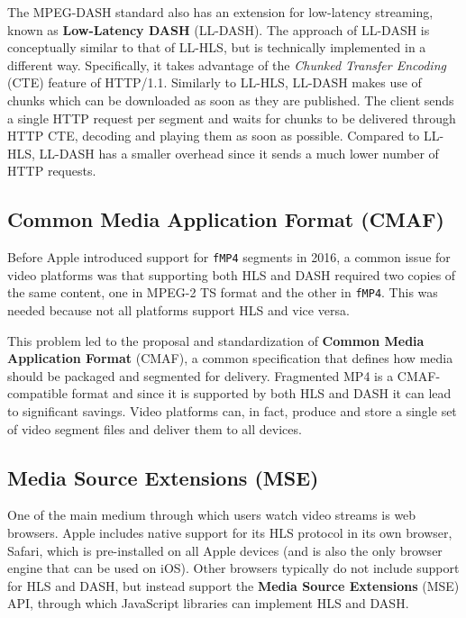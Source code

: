 The MPEG-DASH standard also has an extension for low-latency streaming, known as \textbf{Low-Latency DASH} (LL-DASH). The approach of LL-DASH is conceptually similar to that of LL-HLS, but is technically implemented in a different way. Specifically, it takes advantage of the \textit{Chunked Transfer Encoding} (CTE) feature of HTTP/1.1. Similarly to LL-HLS, LL-DASH makes use of chunks which can be downloaded as soon as they are published. The client sends a single HTTP request per segment and waits for chunks to be delivered through HTTP CTE, decoding and playing them as soon as possible. Compared to LL-HLS, LL-DASH has a smaller overhead since it sends a much lower number of HTTP requests.\cite{llhls_vs_lldash}

\subsection{Common Media Application Format (CMAF)}
\label{sec:bg/technologies/cmaf}

Before Apple introduced support for \texttt{fMP4} segments in 2016, a common issue for video platforms was that supporting both HLS and DASH required two copies of the same content, one in MPEG-2 TS format and the other in \texttt{fMP4}. This was needed because not all platforms support HLS and vice versa.

This problem led to the proposal and standardization of \textbf{Common Media Application Format} (CMAF), a common specification that defines how media should be packaged and segmented for delivery. Fragmented MP4 is a CMAF-compatible format and since it is supported by both HLS and DASH it can lead to significant savings. Video platforms can, in fact, produce and store a single set of video segment files and deliver them to all devices.\cite{cmaf}

\subsection{Media Source Extensions (MSE)}
\label{sec:bg/technologies/mse}

One of the main medium through which users watch video streams is web browsers. Apple includes native support for its HLS protocol in its own browser, Safari, which is pre-installed on all Apple devices (and is also the only browser engine that can be used on iOS). Other browsers typically do not include support for HLS and DASH, but instead support the \textbf{Media Source Extensions} (MSE) API, through which JavaScript libraries can implement HLS and DASH.\cite{mse}

